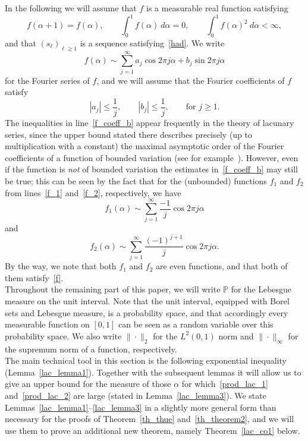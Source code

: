 \documentclass[12pt]{amsart}
\newcommand {\p} {\mathbb{P}}
\begin{document}
In the following we will assume that $f$ is a measurable real function satisfying
\begin{equation} \label{f}
f(\alpha+1)=f(\alpha), \qquad \int_0^1 f(\alpha) ~d\alpha = 0, \qquad \int_0^1 f(\alpha)^2  ~d\alpha < \infty,
\end{equation}
and that $(s_\ell)_{\ell \geq 1}$ is a sequence satisfying~\eqref{had}. We write 
$$
f(\alpha) \sim \sum_{j=1}^\infty a_j \cos 2 \pi j \alpha + b_j \sin 2 \pi j \alpha
$$
for the Fourier series of $f$, and we will assume that the Fourier coefficients of $f$ satisfy
\begin{equation} \label{f_coeff_b}
|a_j| \leq \frac{1}{j}, \qquad |b_j| \leq \frac{1}{j}, \qquad \textrm{for $j \geq 1$}.
\end{equation}
The inequalities in line~\eqref{f_coeff_b} appear frequently in the theory of lacunary series, since the upper bound stated there describes precisely (up to multiplication with a constant) the maximal asymptotic order of the Fourier coefficients of a function of bounded variation (see for example~\cite[p. 48]{zyg}). However, even if the function is \emph{not} of bounded variation the estimates in~\eqref{f_coeff_b} may still be true; this can be seen by the fact that for the (unbounded) functions $f_1$ and $f_2$ from lines~\eqref{f_1} and~\eqref{f_2}, respectively, we have
$$
f_1 (\alpha) \sim \sum_{j=1}^{\infty} \frac{-1}{j} \cos 2 \pi j \alpha 
$$
and
$$
f_2 (\alpha) \sim \sum_{j=1}^{\infty} \frac{(-1)^{j+1}}{j} \cos 2 \pi j \alpha.
$$
By the way, we note that both $f_1$ and $f_2$ are even functions, and that both of them satisfy~\eqref{f}.\\

Throughout the remaining part of this paper, we will write $\p$ for the Lebesgue measure on the unit interval. Note that the unit interval, equipped with Borel sets and Lebesgue measure, is a probability space, and that accordingly every measurable function on $[0,1]$ can be seen as a random variable over this probability space. We also write $\|\cdot \|_2$ for the $L^2 (0,1)$ norm and $\| \cdot \|_\infty$ for the supremum norm of a function, respectively.\\

The main technical tool in this section is the following exponential inequality (Lemma~\ref{lac_lemma1}). Together with the subsequent lemmas it will allow us to give an upper bound for the measure of those $\alpha$ for which~\eqref{prod_lac_1} and~\eqref{prod_lac_2} are large (stated in Lemma~\ref{lac_lemma3}). We state Lemmas~\ref{lac_lemma1}--\ref{lac_lemma3} in a slightly more general form than necessary for the proofs of Theorem~\ref{th_thue} and~\ref{th_theorem2}, and we will use them to prove an additional new theorem, namely Theorem~\ref{lac_co1} below.
\end{document}
